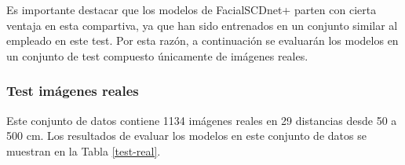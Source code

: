 Es importante destacar que los modelos de FacialSCDnet+ parten con cierta ventaja en esta compartiva, ya que han sido entrenados en un conjunto similar al empleado en este test. Por esta razón, a continuación se evaluarán los modelos en un conjunto de test compuesto únicamente de imágenes reales.


\subsubsection{Test imágenes reales}

Este conjunto de datos contiene 1134 imágenes reales en 29 distancias desde 50 a 500 cm. Los resultados de evaluar los modelos en este conjunto de datos se muestran en la Tabla \ref{test-real}.

\begin{table}[h]
	\centering
\end{table}
